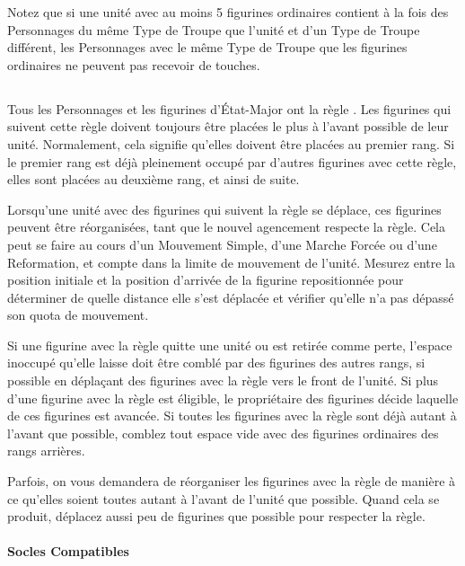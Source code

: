 Notez que si une unité avec au moins 5 figurines ordinaires contient à la fois des Personnages du même Type de Troupe que l'unité et d'un Type de Troupe différent, les Personnages avec le même Type de Troupe que les figurines ordinaires ne peuvent pas recevoir de touches.

\subsection{\newfromWHB{\frontrank}}
\label{front_rank}

Tous les Personnages et les figurines d'État-Major ont la règle \frontrank{}. Les figurines qui suivent cette règle doivent toujours être placées le plus à l'avant possible de leur unité. Normalement, cela signifie qu'elles doivent être placées au premier rang. Si le premier rang est déjà pleinement occupé par d'autres figurines avec cette règle, elles sont placées au deuxième rang, et ainsi de suite.

Lorsqu'une unité avec des figurines qui suivent la règle \frontrank{} se déplace, ces figurines peuvent être réorganisées, tant que le nouvel agencement respecte la règle. Cela peut se faire au cours d'un Mouvement Simple, d'une Marche Forcée ou d'une Reformation, et compte dans la limite de mouvement de l'unité. Mesurez entre la position initiale et la position d'arrivée de la figurine repositionnée pour déterminer de quelle distance elle s'est déplacée et vérifier qu'elle n'a pas dépassé son quota de mouvement.

Si une figurine avec la règle \frontrank{} quitte une unité ou est retirée comme perte, l'espace inoccupé qu'elle laisse doit être comblé par des figurines des autres rangs, si possible en déplaçant des figurines avec la règle \frontrank{} vers le front de l'unité. Si plus d'une figurine avec la règle \frontrank{} est éligible, le propriétaire des figurines décide laquelle de ces figurines est avancée. Si toutes les figurines avec la règle \frontrank{} sont déjà autant à l'avant que possible, comblez tout espace vide avec des figurines ordinaires des rangs arrières.

Parfois, on vous demandera de réorganiser les figurines avec la règle \frontrank{} de manière à ce qu'elles soient toutes autant à l'avant de l'unité que possible. Quand cela se produit, déplacez aussi peu de figurines que possible pour respecter la règle.

\newpage
\paragraph{Socles Compatibles}

